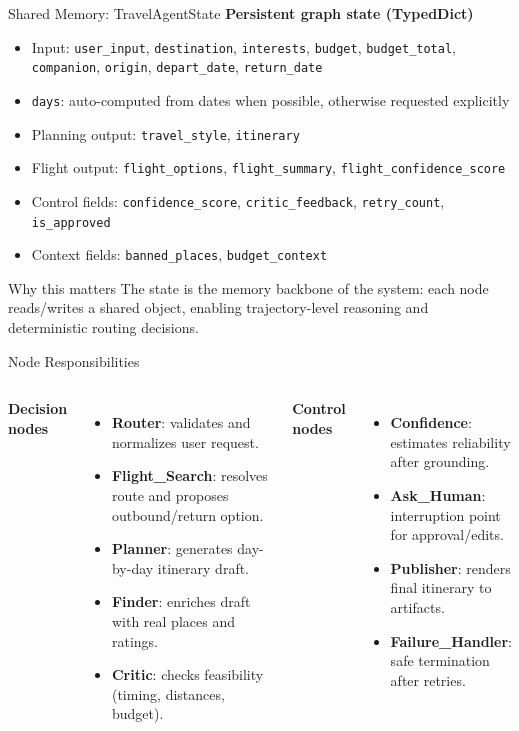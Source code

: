 \documentclass[9pt]{beamer}
\begin{document}
\begin{frame}{Shared Memory: TravelAgentState}
\textbf{Persistent graph state (TypedDict)}
\begin{itemize}
    \item Input: \texttt{user\_input}, \texttt{destination}, \texttt{interests}, \texttt{budget}, \texttt{budget\_total}, \texttt{companion}, \texttt{origin}, \texttt{depart\_date}, \texttt{return\_date}
    \item \texttt{days}: auto-computed from dates when possible, otherwise requested explicitly
    \item Planning output: \texttt{travel\_style}, \texttt{itinerary}
    \item Flight output: \texttt{flight\_options}, \texttt{flight\_summary}, \texttt{flight\_confidence\_score}
    \item Control fields: \texttt{confidence\_score}, \texttt{critic\_feedback}, \texttt{retry\_count}, \texttt{is\_approved}
    \item Context fields: \texttt{banned\_places}, \texttt{budget\_context}
\end{itemize}

\begin{block}{Why this matters}
The state is the memory backbone of the system: each node reads/writes a shared
object, enabling trajectory-level reasoning and deterministic routing decisions.
\end{block}
\end{frame}

\begin{frame}{Node Responsibilities}
\begin{columns}[t]
\textbf{Decision nodes}
\begin{itemize}
    \item \textbf{Router}: validates and normalizes user request.
    \item \textbf{Flight\_Search}: resolves route and proposes outbound/return option.
    \item \textbf{Planner}: generates day-by-day itinerary draft.
    \item \textbf{Finder}: enriches draft with real places and ratings.
    \item \textbf{Critic}: checks feasibility (timing, distances, budget).
\end{itemize}

\textbf{Control nodes}
\begin{itemize}
    \item \textbf{Confidence}: estimates reliability after grounding.
    \item \textbf{Ask\_Human}: interruption point for approval/edits.
    \item \textbf{Publisher}: renders final itinerary to artifacts.
    \item \textbf{Failure\_Handler}: safe termination after retries.
\end{itemize}
\end{columns}
\end{frame}
\end{document}
